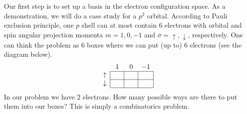 Our first step is to set up a basis in the electron configuration space.
As a demonstration, we will do a case study for a $p^2$ orbital.
According to Pauli exclusion principle, one $p$ shell can at most contain
6 electrons with orbital and spin angular projection momenta $m=1,0,-1$ and
$\sigma=\uparrow,\downarrow$, respectively. One can think the problem as
6 boxes where we can put (up to) 6 electrons (see the diagram below).
\vspace{-0.5em}
\begin{equation*}
\begin{array}{c|c|c|c|}
\multicolumn{1}{c}{} & \multicolumn{1}{c}{\phantom{,}1\phantom{,}} & \multicolumn{1}{c}{\phantom{,}0\phantom{,}} & \multicolumn{1}{c}{-1} \\ \cline{2-4}
\uparrow &  &  &  \\ \cline{2-4}
\downarrow &  &  &  \\
\cline{2-4}
\end{array}
\end{equation*}
In our problem we have 2 electrons. How many possible ways are there
to put them into our boxes? This is simply a combinatorics problem.
